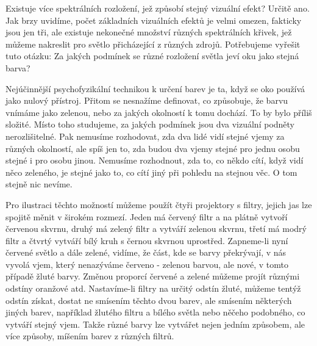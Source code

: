 {    Existuje více spektrálních rozložení, jež způsobí stejný vizuální efekt? Určitě ano. Jak brzy 
    uvidíme, počet základních vizuálních efektů je velmi omezen, fakticky jsou jen tři, ale 
    existuje nekonečné množství různých spektrálních křivek, jež můžeme nakreslit pro světlo 
    přicházející z různých zdrojů. Potřebujeme vyřešit tuto otázku: Za jakých podmínek se různé 
    rozložení světla jeví oku jako stejná barva?
    
    Nejúčinnější psychofyzikální technikou k určení barev je ta, když se oko používá jako nulový 
    přístroj. Přitom se nesnažíme definovat, co způsobuje, že barvu vnímáme jako zelenou, nebo za 
    jakých okolností k tomu dochází. To by bylo příliš složité. Místo toho studujeme, za jakých 
    podmínek jsou dva vizuální podněty nerozlišitelné. Pak nemusíme rozhodovat, zda dva lidé vidí 
    stejné vjemy za různých okolností, ale spíš jen to, zda budou dva vjemy stejné pro jednu osobu 
    stejné i pro osobu jinou. Nemusíme rozhodnout, zda to, co někdo cítí, když vidí něco zeleného, 
    je stejné jako to, co cítí jiný při pohledu na stejnou věc. O tom stejně nic nevíme.
    
    Pro ilustraci těchto možností můžeme použít čtyři projektory s filtry, jejich jas lze spojitě 
    měnit v širokém rozmezí. Jeden má červený filtr a na plátně vytvoří červenou skvrnu, druhý má 
    zelený filtr a vytváří zelenou skvrnu, třetí má modrý filtr a čtvrtý vytváří bílý kruh s černou 
    skvrnou uprostřed. Zapneme-li nyní červené světlo a dále zelené, vidíme, že část, kde se barvy 
    překrývají, v nás vyvolá vjem, který nenazýváme červeno - zelenou barvou, ale nové, v tomto 
    případě žluté barvy. Změnou proporcí červené a zelené můžeme projít různými odstíny oranžové 
    atd. Nastavíme-li filtry na určitý odstín žluté, můžeme tentýž odstín získat, dostat ne 
    smísením těchto dvou barev, ale smísením některých jiných barev, například žlutého filtru a 
    bílého světla nebo něčeho podobného, co vytváří stejný vjem. Takže různé barvy lze vytvářet 
    nejen jedním způsobem, ale více způsoby, míšením barev z různých filtrů.
    
}
